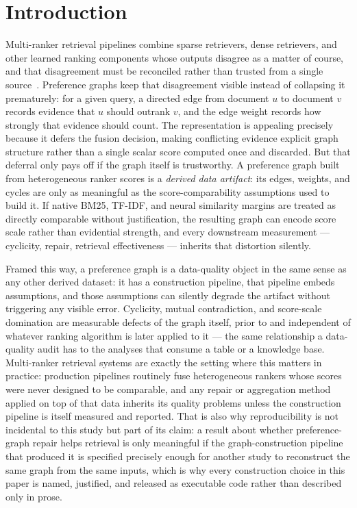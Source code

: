 \documentclass[manuscript,anonymous,review]{acmart}
\begin{document}
\section{Introduction}
\label{sec:introduction}

Multi-ranker retrieval pipelines combine sparse retrievers, dense retrievers,
and other learned ranking components whose outputs disagree as a matter of
course, and that disagreement must be reconciled rather than trusted from a
single source~\cite{liu2011learning,burges2005learning,dwork2001rank,ailon2008aggregating}.
Preference graphs keep that disagreement visible instead of collapsing it
prematurely: for a given query, a directed edge from document $u$ to document
$v$ records evidence that $u$ should outrank $v$, and the edge weight records
how strongly that evidence should count. The representation is appealing
precisely because it defers the fusion decision, making conflicting evidence
explicit graph structure rather than a single scalar score computed once and
discarded. But that deferral only pays off if the graph itself is
trustworthy. A preference graph built from heterogeneous ranker scores is a
\emph{derived data artifact}: its edges, weights, and cycles are only as
meaningful as the score-comparability assumptions used to build it. If native
BM25, TF-IDF, and neural similarity margins are treated as directly comparable
without justification, the resulting graph can encode score scale rather than
evidential strength, and every downstream measurement --- cyclicity, repair,
retrieval effectiveness --- inherits that distortion silently.

Framed this way, a preference graph is a data-quality object in the same
sense as any other derived dataset: it has a construction pipeline, that
pipeline embeds assumptions, and those assumptions can silently degrade the
artifact without triggering any visible error. Cyclicity, mutual
contradiction, and score-scale domination are measurable defects of the
graph itself, prior to and independent of whatever ranking algorithm is
later applied to it --- the same relationship a data-quality audit has to
the analyses that consume a table or a knowledge base. Multi-ranker
retrieval systems are exactly the setting where this matters in practice:
production pipelines routinely fuse heterogeneous rankers whose scores were
never designed to be comparable, and any repair or aggregation method
applied on top of that data inherits its quality problems unless the
construction pipeline is itself measured and reported. That is also why
reproducibility is not incidental to this study but part of its claim: a
result about whether preference-graph repair helps retrieval is only
meaningful if the graph-construction pipeline that produced it is specified
precisely enough for another study to reconstruct the same graph from the
same inputs, which is why every construction choice in this paper is named,
justified, and released as executable code rather than described only in
prose.
\end{document}
